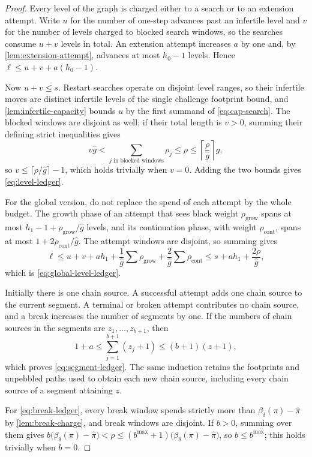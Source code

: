 \documentclass[11pt]{article}
\theoremstyle{plain}
\theoremstyle{remark}
\newcommand{\ghat}{\widehat g}
\newcommand{\pihat}{\widehat{\pi}}
\begin{document}
\begin{proof}
Every level of the graph is charged either to a search or to an extension attempt.
Write \(u\) for the number of one-step advances past an infertile level and \(v\)
for the number of levels charged to blocked search windows, so the searches consume
\(u+v\) levels in total.  An extension attempt increases \(a\) by one and, by
\cref{lem:extension-attempt}, advances at most \(h_0-1\) levels.  Hence
\(\ell\le u+v+a(h_0-1)\).

Now \(u+v\le s\).  Restart searches operate on disjoint level ranges, so their
infertile moves are distinct infertile levels of the single challenge footprint bound,
and
\cref{lem:infertile-capacity} bounds \(u\) by the first summand of
\eqref{eq:cap-search}.  The blocked windows are disjoint as well; if their total length is
\(v>0\), summing their defining strict inequalities gives
\[
 v\ghat<\sum_{j\text{ in blocked windows}}\rho_j\le\rho
 \le\left\lceil\frac{\rho}{\ghat}\right\rceil\ghat ,
\]
so \(v\le\lceil\rho/\ghat\rceil-1\), which holds trivially when \(v=0\).  Adding
the two bounds gives \eqref{eq:level-ledger}.

For the global version, do not replace the spend of each attempt by the whole budget.
The growth phase of an attempt that sees black weight \(\rho_{\mathrm{grow}}\) spans at most
\(h_1-1+\rho_{\mathrm{grow}}/\ghat\) levels, and its continuation phase, with weight
\(\rho_{\mathrm{cont}}\), spans at most \(1+2\rho_{\mathrm{cont}}/\ghat\).  The
attempt windows are disjoint, so summing gives
\[
 \ell\le u+v+a h_1
       +\frac{1}{\ghat}\sum \rho_{\mathrm{grow}}
       +\frac{2}{\ghat}\sum \rho_{\mathrm{cont}}
 \le s+a h_1+\frac{2\rho}{\ghat},
\]
which is \eqref{eq:global-level-ledger}.

Initially there is one chain source.  A successful attempt adds one chain source to the
current segment.  A terminal or broken attempt contributes no chain source, and a break
increases the number of segments by one.  If the numbers of chain sources in the
segments are \(z_1,\ldots,z_{b+1}\), then
\[
 1+a\le\sum_{j=1}^{b+1}(z_j+1)\le(b+1)(z+1),
\]
which proves \eqref{eq:segment-ledger}.  The same induction retains the footprints and
unpebbled paths used to obtain each new chain source, including every chain source of a
segment attaining \(z\).

For \eqref{eq:break-ledger}, every break window spends strictly more than
\(\beta_\delta(\pi)-\pihat\) by \cref{lem:break-charge}, and break windows are
disjoint.  If \(b>0\), summing over them gives
\(b\bigl(\beta_\delta(\pi)-\pihat\bigr)<\rho\le
(b^{\max}+1)\bigl(\beta_\delta(\pi)-\pihat\bigr)\), so \(b\le b^{\max}\); this
holds trivially when \(b=0\).


\end{proof}
\end{document}
